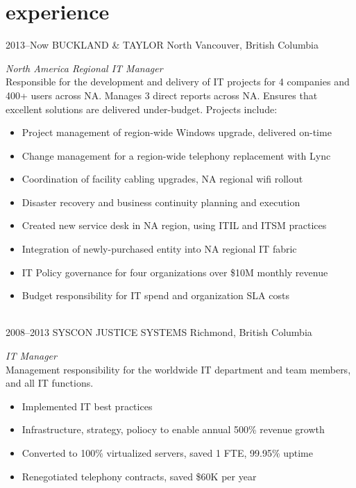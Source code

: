 \documentclass[]{friggeri-cv} %
\begin{document}
\section{experience}

\begin{entrylist}
\entry
{2013--Now}
{BUCKLAND \& TAYLOR}
{North Vancouver, British Columbia}
{\emph{North America Regional IT Manager} \\
Responsible for the development and delivery of IT projects for 4 companies and 400+ users across NA. Manages 3 direct reports across NA. Ensures that excellent solutions are delivered under-budget. Projects include: \\
\begin{itemize}
\item Project management of region-wide Windows upgrade, delivered on-time
\item Change management for a region-wide telephony replacement with Lync
\item Coordination of facility cabling upgrades, NA regional wifi rollout
\item Disaster recovery and business continuity planning and execution
\item Created new service desk in NA region, using ITIL and ITSM practices
\item Integration of newly-purchased entity into NA regional IT fabric
\item IT Policy governance for four organizations over \$10M monthly revenue
\item Budget responsibility for IT spend and organization SLA costs
\end{itemize}}
\\
\entry
{2008--2013}
{SYSCON JUSTICE SYSTEMS}
{Richmond, British Columbia}
{\emph{IT Manager} \\
Management responsibility for the worldwide IT department and team members, and all IT functions. \\
\begin{itemize}
\item Implemented IT best practices
\item Infrastructure, strategy, poliocy to enable annual 500\% revenue growth
\item Converted to 100\% virtualized servers, saved 1 FTE, 99.95\% uptime
\item Renegotiated telephony contracts, saved \$60K per year

\end{itemize}}
\end{entrylist}
\end{document}
